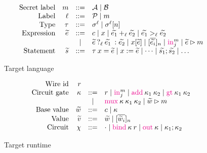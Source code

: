 \newcommand{\lcond}[4]{\ensuremath{{{#2}\:?_{{#1}}\:{#3}\::{#4}}}}

\begin{figure}
  \small
  \[
  \begin{array}{rrcl}
    \ftext{Secret label} & m &::=& \mathcal{A} \mid \mathcal{B}\\
    \ftext{Label} & \ell &::=& \mathcal{P} \mid m\\
    \ftext{Type} & \tau &::=& \sigma^{\ell} \mid \sigma^{\ell}[n]\\
    \ftext{Expression} & \widetilde{e} &::=& c \mid x \mid \widetilde{e_{1}} +_{\ell} \widetilde{e_{2}} \mid \widetilde{e_{1}} >_{\ell} \widetilde{e_{2}} \\
    & & \mid & \lcond{\ell}{{\widetilde{e}}}{{\widetilde{e_{1}}}}{{\widetilde{e_{2}}}} \mid x[\widetilde{e}] \mid [\overline{\widetilde{e_{i}}}]_{n} \mid \kw{in}^{m}_{j} \mid \widetilde{e} \rhd m\\
    \ftext{Statement} & \widetilde{s} &::=& \tau\:x = \widetilde{e} \mid x := \widetilde{e} \mid \dots \mid \widetilde{s_{1}}; \widetilde{s_{2}} \mid \dots\\
  \end{array}
  \]
\label{fig:tgtlang}
\caption{Target language}
\end{figure}

\begin{figure}
  \small
  \[
  \begin{array}{rrcl}
    \ftext{Wire id} & r &&\\
    \ftext{Circuit gate} & \kappa & ::= & r \mid \kw{in}^{m}_{j} \mid \kw{add}\:\kappa_{1}\:\kappa_{2} \mid \kw{gt}\:\kappa_{1}\:\kappa_{2}\\
    & & \mid & \kw{mux}\:\kappa\:\kappa_{1}\:\kappa_{2} \mid \widetilde{w} \rhd m\\
    \ftext{Base value} & \widetilde{w} & ::= & c \mid \kappa\\
    \ftext{Value} & \widetilde{v} & ::= & \widetilde{w} \mid [\overline{\widetilde{w}_{i}}]_{n}\\
    \ftext{Circuit} & \chi & ::= & \cdot \mid \kw{bind}\:\kappa\:r \mid \kw{out}\:\kappa \mid \kappa_{1}; \kappa_{2}
  \end{array}
  \]
\label{fig:tgtruntime}
\caption{Target runtime}
\end{figure}


